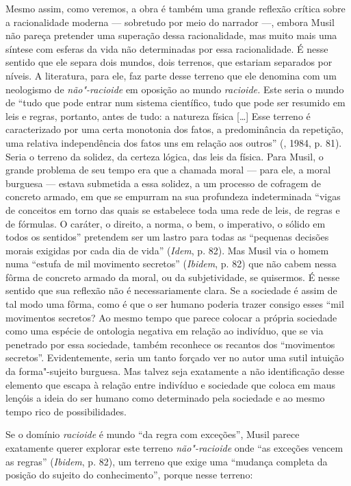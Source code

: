 Mesmo assim, como veremos, a obra é também uma grande reflexão crítica
sobre a racionalidade moderna --- sobretudo por meio do narrador ---,
embora Musil não pareça pretender uma superação dessa racionalidade, mas
muito mais uma síntese com esferas da vida não determinadas por essa
racionalidade. É nesse sentido que ele separa dois mundos, dois
terrenos, que estariam separados por níveis. A literatura, para ele, faz
parte desse terreno que ele denomina com um neologismo de
\emph{não"-racioide} em oposição ao mundo \emph{racioide.} Este seria o
mundo de ``tudo que pode entrar num sistema científico, tudo que pode
ser resumido em leis e regras, portanto, antes de tudo: a natureza
física [\ldots{}] Esse terreno é caracterizado por uma certa
monotonia dos fatos, a predominância da repetição, uma relativa
independência dos fatos uns em relação aos outros'' (, 1984, p. 81). Seria o terreno da solidez, da certeza lógica, das leis da física.
Para Musil, o grande problema de seu tempo era que a chamada moral ---
para ele, a moral burguesa --- estava submetida a essa solidez, a um
processo de cofragem de concreto armado, em que se empurram na sua
profundeza indeterminada ``vigas de conceitos em torno das quais se
estabelece toda uma rede de leis, de regras e de fórmulas. O caráter, o
direito, a norma, o bem, o imperativo, o sólido em todos os sentidos''
pretendem ser um lastro para todas as ``pequenas decisões morais
exigidas por cada dia de vida'' (\emph{Idem}, p. 82). Mas Musil via o
homem numa ``estufa de mil movimento secretos'' (\emph{Ibidem}, p. 82)
que não cabem nessa fôrma de concreto armado da moral, ou da
subjetividade, se quisermos. É nesse sentido que sua reflexão não é
necessariamente clara. Se a sociedade é assim de tal modo uma fôrma,
como é que o ser humano poderia trazer consigo esses ``mil movimentos
secretos? Ao mesmo tempo que parece colocar a própria sociedade como uma
espécie de ontologia negativa em relação ao indivíduo, que se via
penetrado por essa sociedade, também reconhece os recantos dos
``movimentos secretos''. Evidentemente, seria um tanto forçado ver no
autor uma sutil intuição da forma"-sujeito burguesa. Mas talvez seja
exatamente a não identificação desse elemento que escapa à relação entre
indivíduo e sociedade que coloca em maus lençóis a ideia do ser humano
como determinado pela sociedade e ao mesmo tempo rico de possibilidades.

Se o domínio \emph{racioide} é mundo ``da regra com exceções'', Musil
parece exatamente querer explorar este terreno \emph{não"-racioide} onde
``as exceções vencem as regras'' (\emph{Ibidem}, p. 82), um terreno que
exige uma ``mudança completa da posição do sujeito do conhecimento'',
porque nesse terreno:

